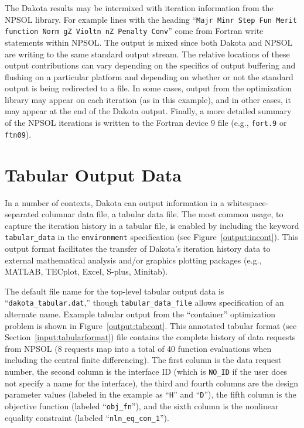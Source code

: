 The Dakota results may be intermixed with iteration information from
the NPSOL library. For example lines with the heading ``\texttt{Majr
  Minr Step Fun Merit function Norm gZ Violtn nZ Penalty Conv}'' come
from Fortran write statements within NPSOL. The output is mixed since
both Dakota and NPSOL are writing to the same standard output
stream. The relative locations of these output contributions can vary
depending on the specifics of output buffering and flushing on a
particular platform and depending on whether or not the standard
output is being redirected to a file. In some cases, output from the
optimization library may appear on each iteration (as in this
example), and in other cases, it may appear at the end of the Dakota
output. Finally, a more detailed summary of the NPSOL iterations is
written to the Fortran device 9 file (e.g., \texttt{fort.9} or
\texttt{ftn09}).

\section{Tabular Output Data}\label{output:tabular}

In a number of contexts, Dakota can output information in a
whitespace-separated columnar data file, a tabular data file.  The
most common usage, to capture the iteration history in a tabular file,
is enabled by including the keyword \texttt{tabular\_data} in the
\texttt{environment} specification (see
Figure~\ref{output:incont}). This output format facilitates the
transfer of Dakota's iteration history data to external mathematical
analysis and/or graphics plotting packages (e.g., MATLAB, TECplot,
Excel, S-plus, Minitab).

The default file name for the top-level tabular output data is
``\texttt{dakota\_tabular.dat},'' though \texttt{tabular\_data\_file}
allows specification of an alternate name.  Example tabular output
from the ``container'' optimization problem is shown in
Figure~\ref{output:tabcont}. This annotated tabular format (see
Section~\ref{input:tabularformat}) file contains the complete history
of data requests from NPSOL (8 requests map into a total of 40
function evaluations when including the central finite
differencing). The first column is the data request number, the second
column is the interface ID (which is \texttt{NO\_ID} if the user does
not specify a name for the interface), the third and fourth columns
are the design parameter values (labeled in the example as
``\texttt{H}'' and ``\texttt{D}''), the fifth column is the objective
function (labeled ``\texttt{obj\_fn}''), and the sixth column is the
nonlinear equality constraint (labeled ``\texttt{nln\_eq\_con\_1}'').

